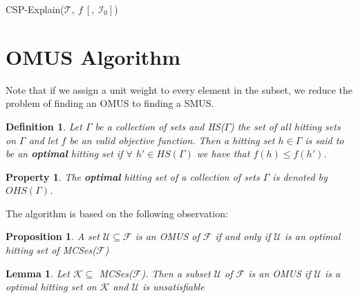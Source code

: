\documentclass{article}
\newcommand\m[1]{\mathcal{#1}}
\newtheorem{definition}[thm]{Definition}
\newtheorem{property}[prop]{Property}
\newtheorem{lemma}[lem]{Lemma}
\newtheorem{proposition}[propo]{Proposition}
\begin{document}
\begin{algorithm}
{{      %

    }

  }
  \caption{CSP-Explain($\m{T} ,\ f \ [,  \ \m{I}_0 ]$)}
  \label{alg:cspExplain}
\end{algorithm}

\clearpage
\section{OMUS Algorithm}

Note that if we assign a unit weight to every element in the subset, we reduce the problem of finding an OMUS to finding a SMUS.

\begin{definition}
  Let $\Gamma$ be a collection of sets and HS($\Gamma$) the set of all hitting sets on $\Gamma$ and let $f$ be an valid objective function. Then a hitting set $ h \in \Gamma$ is said to be an \textbf{optimal} hitting set if $\forall$ $h' \in HS(\Gamma)$ we have that %
  $f(h) \leq f(h')$. %
\end{definition}

\begin{property}
  The \textbf{optimal} hitting set of a collection of sets $\Gamma$ is denoted by $OHS(\Gamma)$.
\end{property}

The algorithm is based on the following observation:

\begin{proposition}\label{prop:optimal-hitting-set}
  A set $\m{U} \subseteq \m{F}$ is an OMUS of $\m{F}$ if and only if $\m{U}$ is an optimal hitting set of MCSes($\m{F}$)
\end{proposition}

\begin{lemma}\label{lemma:K}
  Let $\m{K}  \subseteq$ MCSes($\m{F}$). Then a subset $\m{U}$ of $\m{F}$ is an OMUS if $\m{U}$ is a optimal hitting set on $\m{K}$ and $\m{U}$ is unsatisfiable
\end{lemma}
\end{document}
